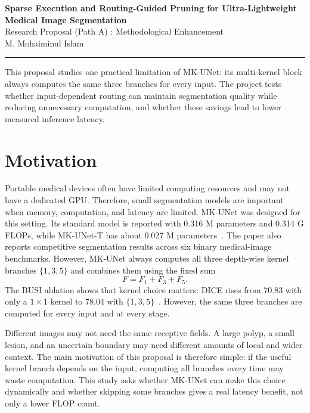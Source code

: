 \documentclass[10pt,a4paper]{article}
\begin{document}
\begin{center}
{\Large\bfseries  Sparse Execution and Routing-Guided Pruning for Ultra-Lightweight Medical Image Segmentation}\\[6pt]

{\small  Research Proposal (Path A)  : Methodological Enhancement}\\[3pt]
{\normalsize M. Mohaiminul Islam}\\[4pt]
\end{center}

\vspace{0.25em}
\noindent\rule{\linewidth}{0.45pt}
\vspace{0.3em}

\noindent
This proposal studies one practical limitation of MK-UNet: its multi-kernel block always computes the same three branches for every input. The project tests whether input-dependent routing can maintain segmentation quality while reducing unnecessary computation, and whether these savings lead to lower measured inference latency.


\section{Motivation}

Portable medical devices often have limited computing resources and may not have a dedicated GPU. Therefore, small segmentation models are important when memory, computation, and latency are limited. MK-UNet was designed for this setting. Its standard model is reported with 0.316 M parameters and 0.314 G FLOPs, while MK-UNet-T has about 0.027 M parameters~\cite{rahman2025mkunet}. The paper also reports competitive segmentation results across six binary medical-image benchmarks. However, MK-UNet always computes all three depth-wise kernel branches $\{1,3,5\}$ and combines them using the fixed sum
\[
F=F_1+F_3+F_5.
\]
The BUSI ablation shows that kernel choice matters: DICE rises from 70.83 with only a $1\times1$ kernel to 78.04 with $\{1,3,5\}$~\cite{rahman2025mkunet}. However, the same three branches are computed for every input and at every stage.

Different images may not need the same receptive fields. A large polyp, a small lesion, and an uncertain boundary may need different amounts of local and wider context. The main motivation of this proposal is therefore simple: if the useful kernel branch depends on the input, computing all branches every time may waste computation. This study asks whether MK-UNet can make this choice dynamically and whether skipping some branches gives a real latency benefit, not only a lower FLOP count.
\end{document}
